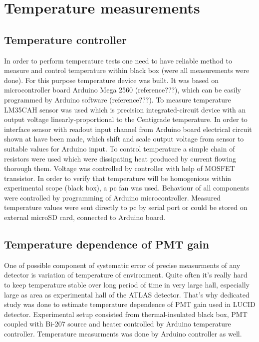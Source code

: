 \section{Temperature measurements}
\label{sec:tempMeas}

\subsection{Temperature controller}
\label{subsec:tempController}

In order to perform temperature tests one need to have reliable method to measure and control temperature within black box (were all measurements were done).
For this purpose temperature device was built.
It was based on microcontroller board Arduino Mega 2560 (reference???), which can be easily programmed by Arduino software (reference???).
To measure temperature LM35CAH sensor was used which is precision integrated-circuit device with an output voltage linearly-proportional to the Centigrade temperature.
In order to interface sensor with readout input channel from Arduino board electrical circuit shown at  have been made, 
which shift and scale output voltage from sensor to suitable values for Arduino input.
To control temperature a simple chain of resistors were used which were dissipating heat produced by current flowing thorough them. 
Voltage was controlled by controller with help of MOSFET transistor. In order to verify that temperature will be homogenious within experimental scope (black box),
a pc fan was used. Behaviour of all components were controlled by programming of Arduino microcontroller.
Measured temperature values were sent directly to pc by serial port or could be stored on external microSD card, connected to Arduino board.

\subsection{Temperature dependence of PMT gain}
\label{subsec:pmtGainTempDep}


One of possible component of systematic error of precise measurments of any detector is variation of temperature of environment.
Quite often it's really hard to keep temperature stable over long period of time in very large hall, especially large as area as experimental hall of the ATLAS detector.
That's why dedicated study was done to estimate temperature dependence of PMT gain used in LUCID detector.
Experimental setup consisted from thermal-insulated black box, PMT coupled with Bi-207 source and heater controlled by Arduino temperature controller.
Temperature measurments was done by Arduino controller as well.


